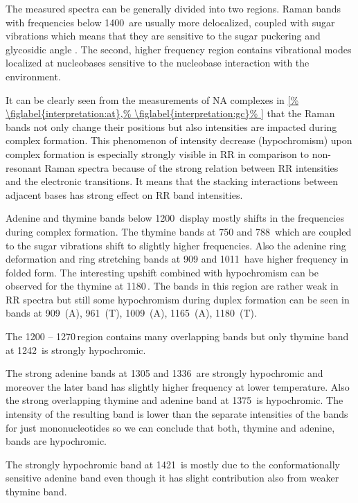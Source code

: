 The measured spectra can be generally divided into two regions. Raman bands
with frequencies below 1400\,\icm{} are usually more delocalized, coupled with
sugar vibrations which means that they are sensitive to the sugar puckering
and glycosidic angle
\parencite{%
	Benevides2005,%
	Nishimura1986b%
}.
The second, higher frequency region contains vibrational modes localized at
nucleobases sensitive to the nucleobase interaction with the environment.

It can be clearly seen from the measurements of NA complexes in
\cref{%
	\figlabel{interpretation:at},%
	\figlabel{interpretation:gc}%
}
that the Raman bands not only change their positions but also intensities are
impacted during complex formation. This phenomenon of intensity decrease
(hypochromism) upon complex formation is especially strongly visible in
RR in comparison to non-resonant Raman spectra because of the strong relation
between RR intensities and the electronic transitions. It means that the
stacking interactions between adjacent bases has strong effect on RR band
intensities.

Adenine and thymine bands below 1200\,\icm{} display mostly shifts in the
frequencies during complex formation. The thymine bands at 750 and 788\,\icm{}
which are coupled to the sugar vibrations
\parencite{Zhu2008}
shift to slightly higher frequencies.
Also the adenine ring deformation and ring stretching bands at 909 and
1011\,\icm{}
\parencite{Xue2000}
have higher frequency in folded form.
The interesting upshift combined with hypochromism can be observed for the
thymine at 1180\,\icm{}.
The bands in this region are rather weak in RR spectra but still some
hypochromism during duplex formation can be seen in bands at
	909\,\icm{} (A),
	961\,\icm{} (T),
	1009\,\icm{} (A),
	1165\,\icm{} (A),
	1180\,\icm{} (T).

The 1200 -- 1270\,\icm region contains many overlapping bands but only thymine
band at 1242\,\icm{} is strongly hypochromic.

The strong adenine bands at 1305 and 1336\,\icm{} are strongly hypochromic and
moreover the later band has slightly higher frequency at lower temperature.
Also the strong overlapping thymine and adenine band at 1375\,\icm{} is
hypochromic. The intensity of the resulting band is lower than the separate
intensities of the bands for just mononucleotides so we can conclude that both,
thymine and adenine, bands are hypochromic.

The strongly hypochromic band at 1421\,\icm{} is mostly due to the
conformationally sensitive adenine band
\parencite{%
	Tomkova1994,%
	Taillandier1989,%
}
even though it has slight contribution also from weaker thymine band.

